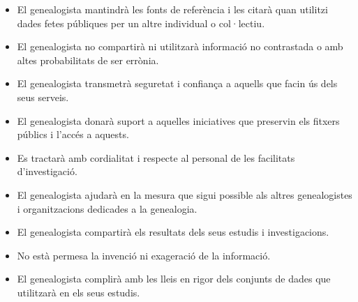     \begin{itemize}
        \item El genealogista mantindrà les fonts de referència i les citarà quan utilitzi dades fetes públiques per un altre individual o col·lectiu.
        \item El genealogista no compartirà ni utilitzarà informació no contrastada o amb altes probabilitats de ser errònia.
        \item El genealogista transmetrà seguretat i confiança a aquells que facin ús dels seus serveis.
        \item El genealogista donarà suport a aquelles iniciatives que preservin els fitxers públics i l'accés a aquests.
        \item Es tractarà amb cordialitat i respecte al personal de les facilitats d'investigació.
        \item El genealogista ajudarà en la mesura que sigui possible als altres genealogistes i organitzacions dedicades a la genealogia.
        \item El genealogista compartirà els resultats dels seus estudis i investigacions.
        \item No està permesa la invenció ni exageració de la informació.
        \item El genealogista complirà amb les lleis en rigor dels conjunts de dades que u\-ti\-lit\-za\-rà en els seus estudis.
    \end{itemize}
